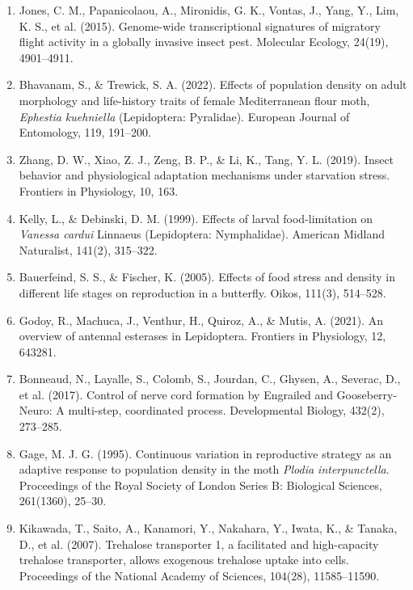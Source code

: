 \documentclass[lineno]{wiley-article}
\begin{document}
\begin{enumerate}
\item Jones, C. M., Papanicolaou, A., Mironidis, G. K., Vontas, J., Yang, Y., Lim, K. S., et al. (2015). Genome-wide transcriptional signatures of migratory flight activity in a globally invasive insect pest. Molecular Ecology, 24(19), 4901–4911.

\item Bhavanam, S., \& Trewick, S. A. (2022). Effects of population density on adult morphology and life-history traits of female Mediterranean flour moth, \textit{Ephestia kuehniella} (Lepidoptera: Pyralidae). European Journal of Entomology, 119, 191–200.

\item Zhang, D. W., Xiao, Z. J., Zeng, B. P., \& Li, K., Tang, Y. L. (2019). Insect behavior and physiological adaptation mechanisms under starvation stress. Frontiers in Physiology, 10, 163.

\item Kelly, L., \& Debinski, D. M. (1999). Effects of larval food-limitation on \textit{Vanessa cardui} Linnaeus (Lepidoptera: Nymphalidae). American Midland Naturalist, 141(2), 315–322.

\item Bauerfeind, S. S., \& Fischer, K. (2005). Effects of food stress and density in different life stages on reproduction in a butterfly. Oikos, 111(3), 514–528.

\item Godoy, R., Machuca, J., Venthur, H., Quiroz, A., \& Mutis, A. (2021). An overview of antennal esterases in Lepidoptera. Frontiers in Physiology, 12, 643281.

\item Bonneaud, N., Layalle, S., Colomb, S., Jourdan, C., Ghysen, A., Severac, D., et al. (2017). Control of nerve cord formation by Engrailed and Gooseberry-Neuro: A multi-step, coordinated process. Developmental Biology, 432(2), 273–285.

\item Gage, M. J. G. (1995). Continuous variation in reproductive strategy as an adaptive response to population density in the moth \textit{Plodia interpunctella}. Proceedings of the Royal Society of London Series B: Biological Sciences, 261(1360), 25–30.

\item Kikawada, T., Saito, A., Kanamori, Y., Nakahara, Y., Iwata, K., \& Tanaka, D., et al. (2007). Trehalose transporter 1, a facilitated and high-capacity trehalose transporter, allows exogenous trehalose uptake into cells. Proceedings of the National Academy of Sciences, 104(28), 11585–11590.


\end{enumerate}
\end{document}
